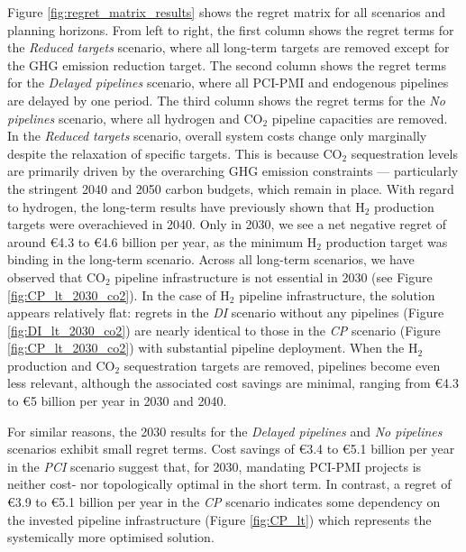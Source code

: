 \documentclass[pdflatex,sn-nature]{sn-jnl}%
\theoremstyle{thmstyleone}%
\theoremstyle{thmstyletwo}%
\theoremstyle{thmstylethree}%
\begin{document}
Figure \ref{fig:regret_matrix_results} shows the regret matrix for all scenarios and planning horizons. From left to right, the first column shows the regret terms for the \textit{Reduced targets} scenario, where all long-term targets are removed except for the GHG emission reduction target. The second column shows the regret terms for the \textit{Delayed pipelines} scenario, where all PCI-PMI and endogenous pipelines are delayed by one period. The third column shows the regret terms for the \textit{No pipelines} scenario, where all hydrogen and CO$_2$ pipeline capacities are removed.
In the \textit{Reduced targets} scenario, overall system costs change only marginally despite the relaxation of specific targets. This is because CO$_2$ sequestration levels are primarily driven by the overarching GHG emission constraints --- particularly the stringent 2040 and 2050 carbon budgets, which remain in place. With regard to hydrogen, the long-term results have previously shown that H$_2$ production targets were overachieved in 2040. Only in 2030, we see a net negative regret of around €4.3 to €4.6 billion per year, as the minimum H$_2$ production target was binding in the long-term scenario. Across all long-term scenarios, we have observed that CO$_2$
 pipeline infrastructure is not essential in 2030 (see Figure \ref{fig:CP_lt_2030_co2}). In the case of H$_2$ pipeline infrastructure, the solution appears relatively flat: regrets in the \textit{DI} scenario without any pipelines (Figure \ref{fig:DI_lt_2030_co2}) are nearly identical to those in the \textit{CP} scenario (Figure \ref{fig:CP_lt_2030_co2}) with substantial pipeline deployment. When the H$_2$ production and CO$_2$ sequestration targets are removed, pipelines become even less relevant, although the associated cost savings are minimal, ranging from €4.3 to €5 billion per year in 2030 and 2040.

For similar reasons, the 2030 results for the \textit{Delayed pipelines} and \textit{No pipelines} scenarios exhibit small regret terms. Cost savings of €3.4 to €5.1 billion per year in the \textit{PCI} scenario suggest that, for 2030, mandating PCI-PMI projects is neither cost- nor topologically optimal in the short term. In contrast, a regret of €3.9 to €5.1 billion per year in the \textit{CP} scenario indicates some dependency on the invested pipeline infrastructure (Figure \ref{fig:CP_lt}) which represents the systemically more optimised solution.
\end{document}
